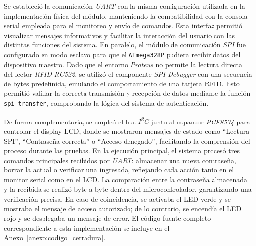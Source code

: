 Se estableció la comunicación \textit{UART} con la misma configuración utilizada en la implementación física del módulo, manteniendo la compatibilidad con la consola serial empleada para el monitoreo y envío de comandos. Esta interfaz permitió visualizar mensajes informativos y facilitar la interacción del usuario con las distintas funciones del sistema. En paralelo, el módulo de comunicación \textit{SPI} fue configurado en modo esclavo para que el \texttt{ATmega328P} pudiera recibir datos del dispositivo maestro. Dado que el entorno \textit{Proteus} no permite la lectura directa del lector \textit{RFID RC522}, se utilizó el componente \textit{SPI Debugger} con una secuencia de bytes predefinida, emulando el comportamiento de una tarjeta RFID. Esto permitió validar la correcta transmisión y recepción de datos mediante la función \texttt{spi\_transfer}, comprobando la lógica del sistema de autenticación.

De forma complementaria, se empleó el bus \textit{I\textsuperscript{2}C} junto al expansor \textit{PCF8574} para controlar el display LCD, donde se mostraron mensajes de estado como “Lectura SPI”, “Contraseña correcta” o “Acceso denegado”, facilitando la comprensión del proceso durante las pruebas. En la ejecución principal, el sistema procesó tres comandos principales recibidos por \textit{UART}: almacenar una nueva contraseña, borrar la actual o verificar una ingresada, reflejando cada acción tanto en el monitor serial como en el LCD. La comparación entre la contraseña almacenada y la recibida se realizó byte a byte dentro del microcontrolador, garantizando una verificación precisa. En caso de coincidencia, se activaba el LED verde y se mostraba el mensaje de acceso autorizado; de lo contrario, se encendía el LED rojo y se desplegaba un mensaje de error. El código fuente completo correspondiente a esta implementación se incluye en el Anexo~\ref{anexo:codigo_cerradura}.




